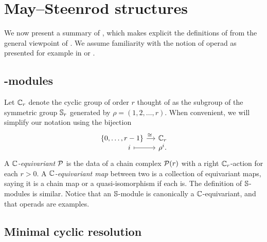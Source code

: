 
\section{May--Steenrod structures}

We now present a summary of \cite{medina2021may_st}, which makes explicit the definitions of \cite{steenrod1953cyclic} from the general viewpoint of \cite{may1970general}.
We assume familiarity with the notion of operad as presented for example in \cite{may1997operads} or \cite{loday2012operads}.

\subsection{\pdfC-modules}

Let $\mathbb{C}_r$ denote the cyclic group of order $r$ thought of as the subgroup of the symmetric group $\mathbb{S}_r$ generated by $\rho = (1,2,\dots,r)$.
When convenient, we will simplify our notation using the bijection
\[
\begin{tikzcd}[column sep=small,row sep=-5]
	\{0,\dots,r-1\} \rar["\cong\ "] & \cyc_r \\
	\qquad i \rar[maps to] & \rho^i.
\end{tikzcd}
\]
A \textit{$\mathbb{C}$-equivariant} $\mathcal{P}$ is the data of a chain complex $\mathcal{P}(r)$ with a right $\mathbb{C}_r$-action for each $r > 0$.
A \textit{$\mathbb{C}$-equivariant map} between two is a collection of equivariant maps, saying it is a chain map or a quasi-isomorphism if each is.
The definition of $\mathbb{S}$-modules is similar.
Notice that an $\mathbb{S}$-module is canonically a $\mathbb{C}$-equivariant, and that operads are examples.

\subsection{Minimal cyclic resolution}

